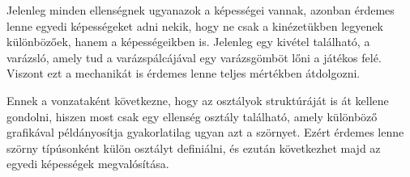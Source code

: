 Jelenleg minden ellenségnek ugyanazok a képességei vannak, azonban érdemes lenne egyedi képességeket adni nekik, hogy ne csak a kinézetükben legyenek különbözőek, hanem a képességeikben is. Jelenleg egy kivétel található, a varázsló, amely tud a varázspálcájával egy varázsgömböt lőni a játékos felé. Viszont ezt a mechanikát is érdemes lenne teljes mértékben átdolgozni.

Ennek a vonzataként következne, hogy az osztályok struktúráját is át kellene gondolni, hiszen most csak egy ellenség osztály található, amely különböző grafikával példányosítja gyakorlatilag ugyan azt a szörnyet. Ezért érdemes lenne szörny típúsonként külön osztályt definiálni, és ezután következhet majd az egyedi képességek megvalósítása.
